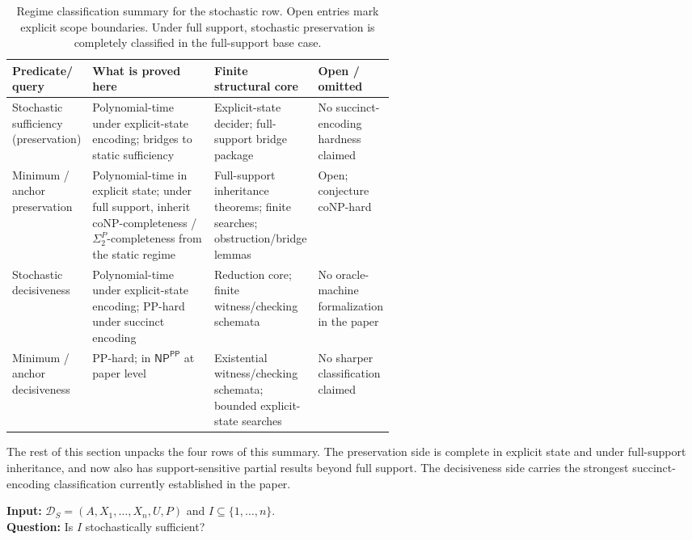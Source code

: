 \begin{table}[h]
\centering
\renewcommand{\tabularxcolumn}[1]{m{#1}}
\begin{tabularx}{\linewidth}{@{}>{\raggedright\arraybackslash\hyphenpenalty=10000\exhyphenpenalty=10000}m{0.15\linewidth}>{\raggedright\arraybackslash}X>{\raggedright\arraybackslash}m{0.22\linewidth}>{\raggedright\arraybackslash}m{0.18\linewidth}@{}}
\toprule
\textbf{Predicate/} \textbf{query} & \textbf{What is proved here} & \textbf{Finite structural core} & \textbf{Open / omitted} \\
\midrule
Stochastic sufficiency (preservation) & Polynomial-time under explicit-state encoding; bridges to static sufficiency & Explicit-state decider; full-support bridge package & No succinct-encoding hardness claimed \\
\midrule
Minimum / anchor preservation & Polynomial-time in explicit state; under full support, inherit coNP-completeness / $\Sigma_2^P$-completeness from the static regime & Full-support inheritance theorems; finite searches; obstruction/bridge lemmas & Open; conjecture coNP-hard \\
\midrule
Stochastic decisiveness & Polynomial-time under explicit-state encoding; PP-hard under succinct encoding & Reduction core; finite witness/checking schemata & No oracle-machine formalization in the paper \\
\midrule
Minimum / anchor decisiveness & PP-hard; in $\textsf{NP}^{\textsf{PP}}$ at paper level & Existential witness/checking schemata; bounded explicit-state searches & No sharper classification claimed \\
\bottomrule
\end{tabularx}
\caption{Regime classification summary for the stochastic row. Open entries mark explicit scope boundaries. Under full support, stochastic preservation is completely classified in the full-support base case.}
\label{tab:stochastic-summary}
\end{table}

The rest of this section unpacks the four rows of this summary. The preservation side is complete in explicit state and under full-support inheritance, and now also has support-sensitive partial results beyond full support. The decisiveness side carries the strongest succinct-encoding classification currently established in the paper.

\begin{problem}\label{prob:stochastic-sufficiency}
\textbf{Input:} $\mathcal{D}_S=(A,X_1,\ldots,X_n,U,P)$ and $I\subseteq\{1,\ldots,n\}$. \\
\textbf{Question:} Is $I$ stochastically sufficient?
\end{problem}


